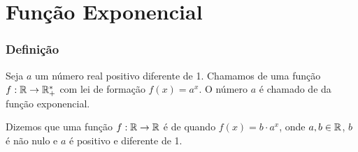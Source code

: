 \documentclass[brazil, notheorems, 10pt]{beamer}
\begin{document}

\section{Função Exponencial}
\begin{frame} \frametitle{Definição}
\begin{Def}
Seja $a$ um número real positivo diferente de 1. Chamamos de
 uma função $f: \mathbb{R} \to \mathbb{R}_+^\ast$ com lei de
formação $f(x) =
 a^x$. O número $a$ é chamado de  da função exponencial.
\end{Def}\pause



\begin{Def}
Dizemos que uma função $f: \mathbb{R} \to \mathbb{R}$ é de 
quando $f(x) =b\cdot a^x$, onde $a,b \in\mathbb{R}$, $b$ é não nulo e $a$ é
positivo e diferente de 1.
\end{Def}





\end{frame}

\end{document}
